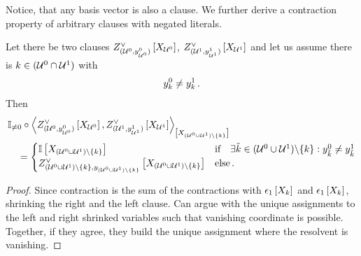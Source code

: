 
Notice, that any basis vector is also a clause.
We further derive a contraction property of arbitrary clauses with negated literals.

\begin{lemma}
    Let there be two clauses $Z^{\lor}_{(\mathcal{U}^0,y^0_{\mathcal{U}^0})}\left[X_{\mathcal{U}^0}\right]$, $Z^{\lor}_{(\mathcal{U}^1,y^1_{\mathcal{U}^1})}\left[X_{\mathcal{U}^1}\right]$ and let us assume there is $k\in(\mathcal{U}^0\cap\mathcal{U}^1)$ with
    \begin{align*}
        y^0_{k} \neq y^1_{k} \, .
    \end{align*}
    Then
    \begin{align*}
        &\mathbb{I}_{\neq0}\circ\left\langle 
            Z^{\lor}_{(\mathcal{U}^0,y^0_{\mathcal{U}^0})}\left[X_{\mathcal{U}^0}\right],
            Z^{\lor}_{(\mathcal{U}^1,y^1_{\mathcal{U}^1})}\left[X_{\mathcal{U}^1}\right]
        \right\rangle_{\left[ 
            X_{(\mathcal{U}^0\cup\mathcal{U}^1)\backslash\{k\}}
         \right]} \\
        &\quad=
        \begin{cases}
            \mathbb{I}\left[X_{(\mathcal{U}^0\cup\mathcal{U}^1)\backslash\{k\}}\right]
            & \text{if}\quad \exists{\tilde{k}\in(\mathcal{U}^0\cup\mathcal{U}^1)\backslash\{k\}}:{y^0_{\tilde{k}}\neq y^1_{\tilde{k}}} \\
            Z^{\lor}_{(\mathcal{U}^0\cup\mathcal{U}^1)\backslash\{k\},y_{(\mathcal{U}^0\cup\mathcal{U}^1)\backslash\{k\}}}\left[
                X_{(\mathcal{U}^0\cup\mathcal{U}^1)\backslash\{k\}}
            \right] & \text{else} \, .
        \end{cases}
    \end{align*}
\end{lemma}
\begin{proof}
    Since contraction is the sum of the contractions with $\epsilon_{1}\left[X_{k}\right]$ and $\epsilon_{1}\left[X_{k}\right]$, shrinking the right and the left clause.
    Can argue with the unique assignments to the left and right shrinked variables such that vanishing coordinate is possible.
    Together, if they agree, they build the unique assignment where the resolvent is vanishing.
\end{proof}


